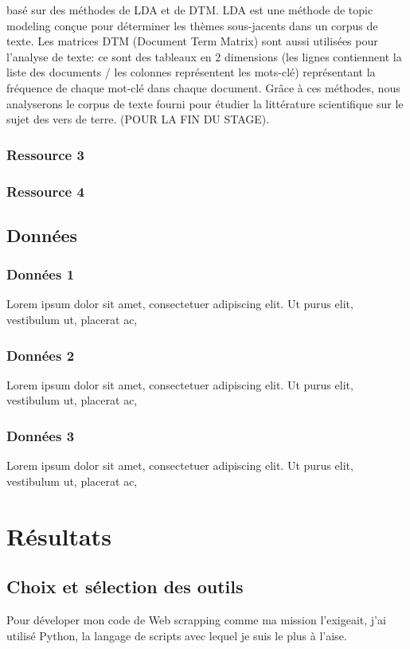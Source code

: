 \documentclass{book}
\begin{document}
basé sur des méthodes de LDA et de DTM. LDA est une méthode de topic modeling
conçue pour déterminer les thèmes sous-jacents dans un corpus de texte. Les
matrices DTM (Document Term Matrix) sont aussi utilisées pour l'analyse de
texte: ce sont des tableaux en 2 dimensions (les lignes contiennent la liste
des documents / les colonnes représentent les mots-clé) représentant la
fréquence de chaque mot-clé dans chaque document. Grâce à ces méthodes, nous
analyserons le corpus de texte fourni pour étudier la littérature scientifique
sur le sujet des vers de terre. (POUR LA FIN DU STAGE).

\subsection{Ressource 3}
\noindent

\subsection{Ressource 4}
\noindent

\section{Données}
\noindent

\subsection{Données 1}
\noindent
Lorem ipsum dolor sit amet, consectetuer adipiscing elit. Ut purus elit,
vestibulum ut, placerat ac,

\subsection{Données 2}
\noindent
Lorem ipsum dolor sit amet, consectetuer adipiscing elit. Ut purus elit,
vestibulum ut, placerat ac,

\subsection{Données 3}
\noindent
Lorem ipsum dolor sit amet, consectetuer adipiscing elit. Ut purus elit,
vestibulum ut, placerat ac,

\chapter{\label{Troisième Chapitre}Résultats}

\section{Choix et sélection des outils}
\noindent
Pour déveloper mon code de Web scrapping comme ma mission l'exigeait, j'ai
utilisé Python, la langage de scripts avec lequel je suis le plus à l'aise.
\end{document}
